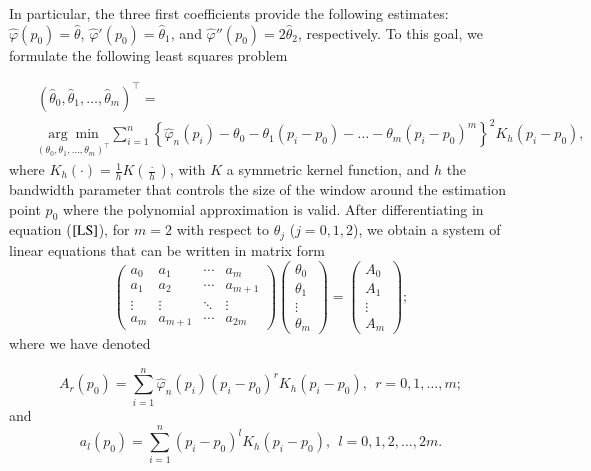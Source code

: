 \documentclass[preprint,12pt]{elsarticle}
\begin{document}
In particular, the three first coefficients provide the following estimates: $\widehat{\varphi}(p_0)=\widehat{\theta}$, $\widehat{\varphi}'(p_0)=\widehat{\theta}_1$, and $\widehat{\varphi}''(p_0)=2\widehat{\theta}_2$, respectively.
To this goal, we formulate the following least squares problem

\begin{eqnarray}\label{LS}
&&\left(\widehat{\theta}_0,\widehat{\theta}_1,\ldots,\widehat{\theta}_m\right)^{\intercal}= \\
\nonumber &&\underset{\left({\theta}_0,\theta_1,\ldots, {\theta}_m\right)^{\intercal}}{\arg \min} \sum_{i=1}^n\left\{\widehat{\varphi}_n(p_i)-\theta_0-\theta_1(p_i-p_0)-\ldots-\theta_m(p_i-p_0)^m\right\}^2 K_h(p_i-p_0),
\end{eqnarray}
where $K_h(\cdot)=\frac{1}{h}K(\frac{\cdot}{h})$, with $K$ a symmetric kernel function, and $h$ the bandwidth parameter that controls the size of the window around the estimation point $p_0$ where the polynomial approximation is valid.
After differentiating in equation ($\ref{LS}$), for $m=2$ with respect to $\theta_j$ ($j=0, 1, 2$), we obtain a system of linear equations that can be written in matrix form
\begin{equation}\label{score}
\left(\begin{array}{cccc}
a_0 & a_1&\cdots &a_m \\ 
a_{1} & a_2&\cdots &a_{m+1}\\
\vdots & \vdots &\ddots &\vdots \\ 
a_m & a_{m+1}&\cdots &a_{2 m} 
\end{array}\right)
\left(\begin{array}{c}
 \theta_0 \\ 
\theta_1 \\ 
\vdots \\
\theta_m
 \end{array}\right)=
\left(\begin{array}{c} 
A_0 \\ 
A_1 \\ 
\vdots \\
A_m
 \end{array}\right);
\end{equation}
where we have denoted

\begin{equation}\label{bigA}
A_r(p_0)=\sum_{i=1}^n\widehat{\varphi}_n(p_i)(p_i-p_0)^r K_h(p_i-p_0), \ \ r=0,1,\ldots,m;
\end{equation}
and 
\begin{equation}\label{smallA}
a_l(p_0)=\sum_{i=1}^n(p_i-p_0)^l K_h(p_i-p_0), \ \ l=0,1,2,\ldots,2m.
\end{equation}
\end{document}
